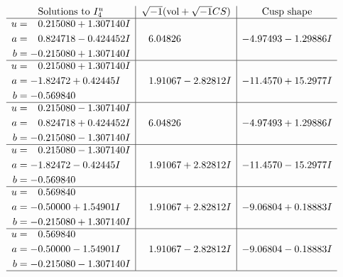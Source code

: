 \documentclass[1p]{elsarticle_modified}
\theoremstyle{definition}
\newcommand{\I}{\sqrt{-1}}
\begin{document}
$$\begin{array}{c|c|c}  
\text{Solutions to }I^u_{4}& \I (\text{vol} + \sqrt{-1}CS) & \text{Cusp shape}\\
 \hline 
\begin{aligned}
u &= \phantom{-}0.215080 + 1.307140 I \\
a &= \phantom{-}0.824718 - 0.424452 I \\
b &= -0.215080 + 1.307140 I\end{aligned}
 & \phantom{-}6.04826\phantom{ +0.000000I} & -4.97493 - 1.29886 I \\ \hline\begin{aligned}
u &= \phantom{-}0.215080 + 1.307140 I \\
a &= -1.82472 + 0.42445 I \\
b &= -0.569840\phantom{ +0.000000I}\end{aligned}
 & \phantom{-}1.91067 - 2.82812 I & -11.4570 + 15.2977 I \\ \hline\begin{aligned}
u &= \phantom{-}0.215080 - 1.307140 I \\
a &= \phantom{-}0.824718 + 0.424452 I \\
b &= -0.215080 - 1.307140 I\end{aligned}
 & \phantom{-}6.04826\phantom{ +0.000000I} & -4.97493 + 1.29886 I \\ \hline\begin{aligned}
u &= \phantom{-}0.215080 - 1.307140 I \\
a &= -1.82472 - 0.42445 I \\
b &= -0.569840\phantom{ +0.000000I}\end{aligned}
 & \phantom{-}1.91067 + 2.82812 I & -11.4570 - 15.2977 I \\ \hline\begin{aligned}
u &= \phantom{-}0.569840\phantom{ +0.000000I} \\
a &= -0.50000 + 1.54901 I \\
b &= -0.215080 + 1.307140 I\end{aligned}
 & \phantom{-}1.91067 + 2.82812 I & -9.06804 + 0.18883 I \\ \hline\begin{aligned}
u &= \phantom{-}0.569840\phantom{ +0.000000I} \\
a &= -0.50000 - 1.54901 I \\
b &= -0.215080 - 1.307140 I\end{aligned}
 & \phantom{-}1.91067 - 2.82812 I & -9.06804 - 0.18883 I\\
 \hline 
 \end{array}$$\newpage\newpage\renewcommand{\arraystretch}{1}
\end{document}

